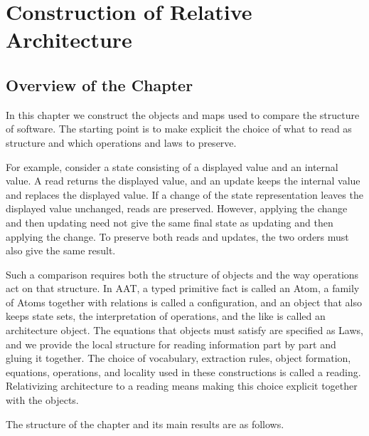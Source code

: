 \chapter{Construction of Relative Architecture}\label{chap:1}

\section*{Overview of the Chapter}

In this chapter we construct the objects and maps used to compare the structure of
software. The starting point is to make explicit the choice of what to read as
structure and which operations and laws to preserve.

For example, consider a state consisting of a displayed value and an internal value.
A read returns the displayed value, and an update keeps the internal value and
replaces the displayed value. If a change of the state representation leaves the
displayed value unchanged, reads are preserved. However, applying the change and
then updating need not give the same final state as updating and then applying the
change. To preserve both reads and updates, the two orders must also give the same
result.

Such a comparison requires both the structure of objects and the way operations act
on that structure. In AAT, a typed primitive fact is called an Atom, a family of
Atoms together with relations is called a configuration, and an object that also
keeps state sets, the interpretation of operations, and the like is called an architecture
object. The equations that objects must satisfy are specified as Laws, and we
provide the local structure for reading information part by part and gluing it
together. The choice of vocabulary, extraction rules, object formation, equations,
operations, and locality used in these constructions is called a reading.
Relativizing architecture to a reading means making this choice explicit together
with the objects.

The structure of the chapter and its main results are as follows.

